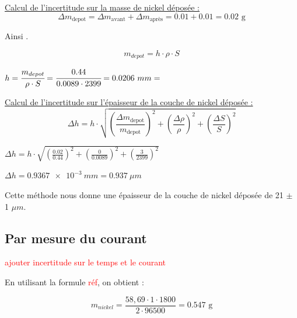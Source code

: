 \underline{Calcul de l'incertitude sur la masse de nickel déposée :}
\begin{equation}
    \Delta m_{\text{depot}} = \Delta m_{\text{avant}} + \Delta m_{\text{après}} = 0.01 + 0.01 = 0.02 \text{ g}
\end{equation}

Ainsi .

\vspace{0.6cm}
\underline{}
\begin{equation}
    m_{depot} = h\cdot\rho\cdot S
\end{equation}
\begin{center}
    $h = \cfrac{m_{depot}}{\rho\cdot S} = \cfrac{0.44}{0.0089\cdot2399} = 0.0206 \ mm =$ 
\end{center}




\underline{Calcul de l'incertitude sur l'épaisseur de la couche de nickel déposée :}
\begin{equation}
    \Delta h = h\cdot\sqrt{\left(\frac{\Delta m_{\text{depot}}}{m_{\text{depot}}}\right)^2 + \left(\frac{\Delta \rho}{\rho}\right)^2 + \left(\frac{\Delta S}{S}\right)^2}
\end{equation}

\begin{center}
    $\Delta h = h\cdot\sqrt{\left(\frac{0.02}{0.44}\right)^2 + \left(\frac{0}{0.0089}\right)^2 + \left(\frac{3}{2399}\right)^2}$
    \vspace{0.3cm}   

    $\Delta h = \num{0.9367e-3} \ mm = 0.937 \ \mu m $ 
\end{center}

Cette méthode nous donne une épaisseur de la couche de nickel déposée de 21 $\pm$ 1 $\mu m$. 

\subsection{Par mesure du courant}
\textcolor{red}{ajouter incertitude sur le temps et le courant}


En utilisant la formule \textcolor{red}{réf}, on obtient : 

\begin{equation}
    m_{nickel} = \frac{58,69 \cdot 1 \cdot 1800}{2 \cdot 96500} = 0.547 \text{ g}
\end{equation}

